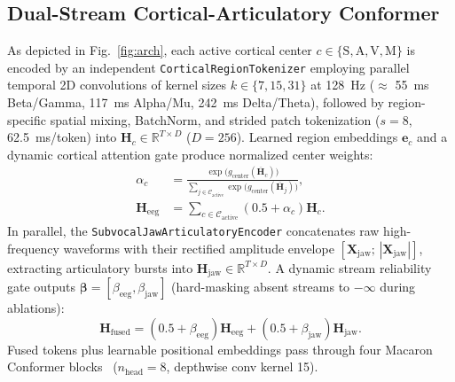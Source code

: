 \documentclass[journal]{IEEEtran}
\begin{document}
\subsection{Dual-Stream Cortical-Articulatory Conformer}
As depicted in Fig.~\ref{fig:arch}, each active cortical center $c \in \{\text{S}, \text{A}, \text{V}, \text{M}\}$ is encoded by an independent \texttt{CorticalRegionTokenizer} employing parallel temporal 2D convolutions of kernel sizes $k \in \{7, 15, 31\}$ at 128~Hz ($\approx$ 55~ms Beta/Gamma, 117~ms Alpha/Mu, 242~ms Delta/Theta), followed by region-specific spatial mixing, BatchNorm, and strided patch tokenization ($s=8$, 62.5~ms/token) into $\mathbf{H}_c \in \mathbb{R}^{T \times D}$ ($D=256$). Learned region embeddings $\mathbf{e}_c$ and a dynamic cortical attention gate produce normalized center weights:
\begin{align}
    \alpha_c &= \frac{\exp\!\big(g_{\text{center}}(\overline{\mathbf{H}}_c)\big)}{\sum_{j \in \mathcal{C}_{\text{active}}} \exp\!\big(g_{\text{center}}(\overline{\mathbf{H}}_j)\big)}, \nonumber \\
    \mathbf{H}_{\text{eeg}} &= \sum_{c \in \mathcal{C}_{\text{active}}} (0.5 + \alpha_c)\mathbf{H}_c.
\end{align}
In parallel, the \texttt{SubvocalJawArticulatoryEncoder} concatenates raw high-frequency waveforms with their rectified amplitude envelope $[\mathbf{X}_{\text{jaw}};\, |\mathbf{X}_{\text{jaw}}|]$, extracting articulatory bursts into $\mathbf{H}_{\text{jaw}} \in \mathbb{R}^{T \times D}$. A dynamic stream reliability gate outputs $\boldsymbol{\beta} = [\beta_{\text{eeg}}, \beta_{\text{jaw}}]$ (hard-masking absent streams to $-\infty$ during ablations):
\begin{equation}
    \mathbf{H}_{\text{fused}} = (0.5 + \beta_{\text{eeg}})\mathbf{H}_{\text{eeg}} + (0.5 + \beta_{\text{jaw}})\mathbf{H}_{\text{jaw}}.
\end{equation}
Fused tokens plus learnable positional embeddings pass through four Macaron Conformer blocks~\cite{gulati2020conformer} ($n_{\text{head}}=8$, depthwise conv kernel 15).
\end{document}
